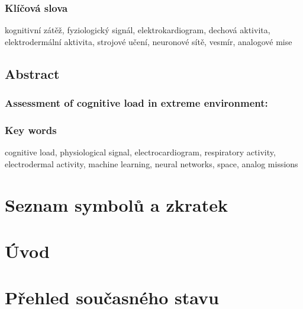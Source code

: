 \documentclass[a4paper,12pt,czech,oneside]{memoir}
\numberwithin{equation}{chapter}
\newcommand{\nazevENG}{Assessment of cognitive load in extreme environment}
\begin{document}
\subsection*{Klíčová slova}
kognitivní zátěž, fyziologický signál, elektrokardiogram, dechová aktivita,
elektrodermální aktivita, strojové učení, neuronové sítě, vesmír, analogové mise
\clearpage

\null\vfill
\section*{Abstract}
\subsection*{\nazevENG:}

\subsection*{Key words}
cognitive load, physiological signal, electrocardiogram, respiratory activity,
electrodermal activity, machine learning, neural networks, space, analog missions
\clearpage

\pagestyle{plain}

\setlength\beforechapskip{-\baselineskip}
\setlength\afterchapskip{10pt}
\renewcommand{\contentsname}{\sffamily Obsah}
\tableofcontents*

\glsaddall
\clearpage

\chapter*{\sffamily Seznam symbolů a zkratek}
\printsymbols[style=long-cz-symbols]
\printacronyms[style=long-cz-acronyms]
\clearpage

\pagestyle{ruled}

\chapter{Úvod}

\clearpage

\chapter{Přehled současného stavu}

\clearpage
\end{document}
